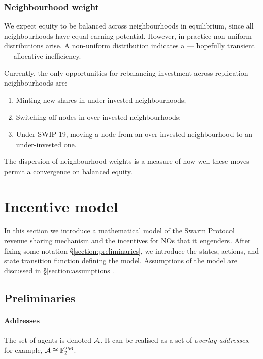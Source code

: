 \subsubsection{Neighbourhood weight}

We expect equity to be balanced across neighbourhoods in equilibrium, since all neighbourhoods have equal earning potential.
%
However, in practice non-uniform distributions arise.
%
A non-uniform distribution indicates a --- hopefully transient --- allocative inefficiency.

Currently, the only opportunities for rebalancing investment across replication neighbourhoods are:
\begin{enumerate}
  \item Minting new shares in under-invested neighbourhoods;
  \item Switching off nodes in over-invested neighbourhoods;
  \item Under SWIP-19, moving a node from an over-invested neighbourhood to an under-invested one.
\end{enumerate}
%
The dispersion of neighbourhood weights is a measure of how well these moves permit a convergence on balanced equity.


\newpage

\section{Incentive model}
\label{section:model}

In this section we introduce a mathematical model of the Swarm Protocol revenue sharing mechanism and the incentives for NOs that it engenders.
%
After fixing some notation \S\ref{section:preliminaries}, we introduce the states, actions, and state transition function defining the model.
%
Assumptions of the model are discussed in \S\ref{section:assumptions}.

\subsection{Preliminaries}

\paragraph{Addresses}

The set of agents is denoted $\mathcal{A}$.
%
It can be realised as a set of \emph{overlay addresses}, for example, $\mathcal{A} \cong \mathbb{F}_2^{256}$.

